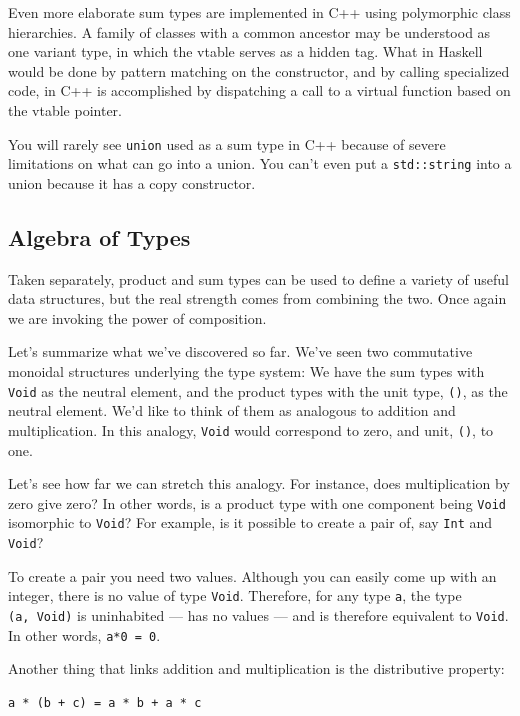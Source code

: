 Even more elaborate sum types are implemented in C++ using polymorphic
class hierarchies. A family of classes with a common ancestor may be
understood as one variant type, in which the vtable serves as a hidden
tag. What in Haskell would be done by pattern matching on the
constructor, and by calling specialized code, in C++ is accomplished by
dispatching a call to a virtual function based on the vtable pointer.

You will rarely see \texttt{union} used as a sum type in C++ because of
severe limitations on what can go into a union. You can't even put a
\texttt{std::string} into a union because it has a copy constructor.

\subsection{Algebra of Types}\label{algebra-of-types}

Taken separately, product and sum types can be used to define a variety
of useful data structures, but the real strength comes from combining
the two. Once again we are invoking the power of composition.

Let's summarize what we've discovered so far. We've seen two commutative
monoidal structures underlying the type system: We have the sum types
with \texttt{Void} as the neutral element, and the product types with
the unit type, \texttt{()}, as the neutral element. We'd like to think
of them as analogous to addition and multiplication. In this analogy,
\texttt{Void} would correspond to zero, and unit, \texttt{()}, to one.

Let's see how far we can stretch this analogy. For instance, does
multiplication by zero give zero? In other words, is a product type with
one component being \texttt{Void} isomorphic to \texttt{Void}? For
example, is it possible to create a pair of, say \texttt{Int} and
\texttt{Void}?

To create a pair you need two values. Although you can easily come up
with an integer, there is no value of type \texttt{Void}. Therefore, for
any type \texttt{a}, the type \texttt{(a,\ Void)} is uninhabited --- has
no values --- and is therefore equivalent to \texttt{Void}. In other
words, \texttt{a*0\ =\ 0}.

Another thing that links addition and multiplication is the distributive
property:

\begin{verbatim}
a * (b + c) = a * b + a * c
\end{verbatim}

